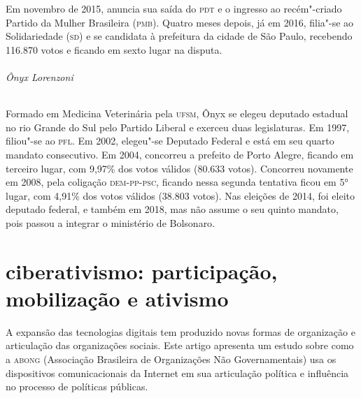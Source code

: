 \begin{bibliohedra}
Em novembro de 2015, anuncia sua saída do \textsc{pdt} e o ingresso ao
recém"-criado Partido da Mulher Brasileira (\textsc{pmb}). Quatro meses depois, já
em 2016, filia"-se ao Solidariedade (\textsc{sd}) e se candidata à prefeitura da
cidade de São Paulo, recebendo 116.870 votos e ficando em sexto lugar na
disputa.

\enlargethispage{\baselineskip}

\paragraph{Ônyx Lorenzoni} Formado em Medicina Veterinária pela \textsc{ufsm}, Ônyx se elegeu deputado
estadual no rio Grande do Sul pelo Partido Liberal e exerceu duas
legislaturas. Em 1997, filiou"-se ao \textsc{pfl}. Em 2002, elegeu"-se Deputado
Federal e está em seu quarto mandato consecutivo. Em 2004, concorreu a
prefeito de Porto Alegre, ficando em terceiro lugar, com 9,97\% dos
votos válidos (80.633 votos). Concorreu novamente em 2008, pela
coligação \textsc{dem}-\textsc{pp}-\textsc{psc}, ficando nessa segunda tentativa ficou em 5° lugar,
com 4,91\% dos votos válidos (38.803 votos). Nas eleições de 2014, foi
eleito deputado federal, e também em 2018, mas não assume o seu quinto
mandato, pois passou a integrar o ministério de Bolsonaro.
\end{bibliohedra}

\part{ciberativismo: participação, mobilização e ativismo} %


\begin{flushright}
\end{flushright}


\noindent{}A expansão das tecnologias digitais tem produzido novas formas de
organização e articulação das organizações sociais. Este artigo
apresenta um estudo sobre como a \textsc{abong} (Associação Brasileira de
Organizações Não Governamentais) usa os dispositivos comunicacionais da
Internet em sua articulação política e influência no processo de
políticas públicas.


